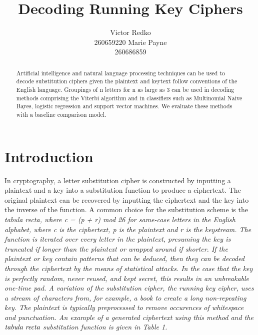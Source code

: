 \documentclass[11pt,letterpaper]{article}
\title{Decoding Running Key Ciphers}
\author{Victor Redko\\
	    260659220
	  \And
	Marie Payne\\
  	260686859}
\date{}
\begin{document}
\maketitle

\begin{abstract}
 
 Artificial intelligence and natural language processing techniques can be used to decode substitution ciphers given the plaintext and keytext follow conventions of the English language. Groupings of n letters for n as large as 3 can be used in decoding methods comprising the Viterbi algorithm and in classifiers such as Multinomial Naive Bayes, logistic regression and support vector machines. We evaluate these methods with a baseline comparison model.
 
\end{abstract}

\section{Introduction}

In cryptography, a letter substitution cipher is constructed by inputting a plaintext and a key into a substitution function to produce a ciphertext. The original plaintext can be recovered by inputting the ciphertext and the key into the inverse of the function. A common choice for the substitution scheme is the \em tabula recta, \em where c = (p + r) mod 26 for same-case letters in the English alphabet, where c is the ciphertext, p is the plaintext and r is the keystream. The function is iterated over every letter in the plaintext, presuming the key is truncated if longer than the plaintext or wrapped around if shorter. If the plaintext or key contain patterns that can be deduced, then they can be decoded through the ciphertext by the means of statistical attacks. In the case that the key is perfectly random, never reused, and kept secret, this results in an unbreakable one-time pad. A variation of the substitution cipher, the running key cipher, uses a stream of characters from, for example, a book to create a long non-repeating key. The plaintext is typically preprocessed to remove occurences of whitespace and punctuation. An example of a generated ciphertext using this method and the $\emph{tabula recta}$ substitution function is given in Table 1.
\end{document}
